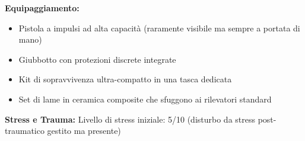 \documentclass[11pt,a4paper]{article}
\begin{document}
\begin{tcolorbox}[colback=mininglightorange!20, colframe=miningorange]
\textbf{Equipaggiamento:}
\begin{itemize}[leftmargin=*]
\item Pistola a impulsi ad alta capacità (raramente visibile ma sempre a portata di mano)
\item Giubbotto con protezioni discrete integrate
\item Kit di sopravvivenza ultra-compatto in una tasca dedicata
\item Set di lame in ceramica composite che sfuggono ai rilevatori standard
\end{itemize}

\textbf{Stress e Trauma:} Livello di stress iniziale: 5/10 (disturbo da stress post-traumatico gestito ma presente)
\end{tcolorbox}
\end{document}
